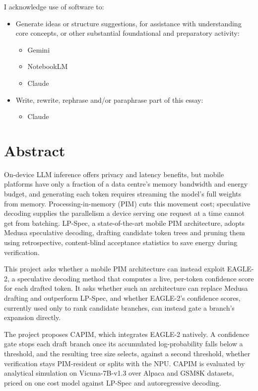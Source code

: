 \documentclass[11pt]{article}
\begin{document}
I acknowledge use of software to:
\begin{itemize}
    \item Generate ideas or structure suggestions, for assistance with understanding core concepts, or other substantial foundational and preparatory activity:
    \begin{itemize}
        \item Gemini
        \item NotebookLM
        \item Claude
    \end{itemize}
    \item Write, rewrite, rephrase and/or paraphrase part of this essay:
    \begin{itemize}
        \item Claude
    \end{itemize}
\end{itemize}



\newpage
\section*{\centering Abstract}

On-device LLM inference offers privacy and latency benefits, but mobile platforms have only a fraction of a data centre's memory bandwidth and energy budget, and generating each token requires streaming the model's full weights from memory. Processing-in-memory (PIM) cuts this movement cost; speculative decoding supplies the parallelism a device serving one request at a time cannot get from batching. LP-Spec, a state-of-the-art mobile PIM architecture, adopts Medusa speculative decoding, drafting candidate token trees and pruning them using retrospective, content-blind acceptance statistics to save energy during verification.

This project asks whether a mobile PIM architecture can instead exploit EAGLE-2, a speculative decoding method that computes a live, per-token confidence score for each drafted token. It asks whether such an architecture can replace Medusa drafting and outperform LP-Spec, and whether EAGLE-2's confidence scores, currently used only to rank candidate branches, can instead gate a branch's expansion directly.

The project proposes CAPIM, which integrates EAGLE-2 natively. A confidence gate stops each draft branch once its accumulated log-probability falls below a threshold, and the resulting tree size selects, against a second threshold, whether verification stays PIM-resident or splits with the NPU. CAPIM is evaluated by analytical simulation on Vicuna-7B-v1.3 over Alpaca and GSM8K datasets, priced on one cost model against LP-Spec and autoregressive decoding.
\end{document}
